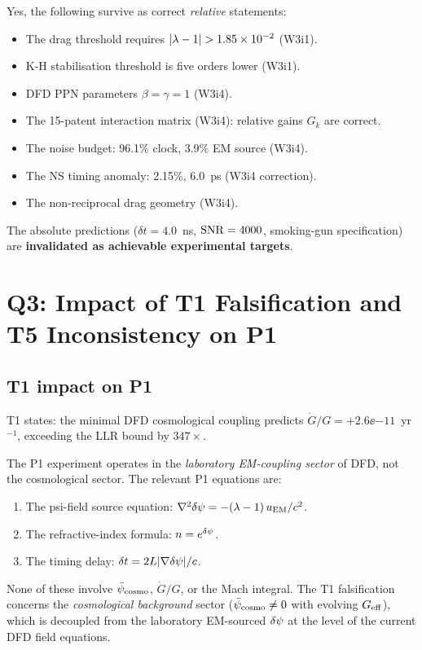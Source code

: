 Yes, the following survive as correct \emph{relative} statements:
\begin{itemize}[nosep]
\item The drag threshold requires $|\lambda - 1| > 1.85\times 10^{-2}$ (W3i1).
\item K-H stabilisation threshold is five orders lower (W3i1).
\item DFD PPN parameters $\beta = \gamma = 1$ (W3i4).
\item The 15-patent interaction matrix (W3i4): relative gains $G_k$ are
  correct.
\item The noise budget: 96.1\% clock, 3.9\% EM source (W3i4).
\item The NS timing anomaly: 2.15\%, 6.0~ps (W3i4 correction).
\item The non-reciprocal drag geometry (W3i4).
\end{itemize}

The absolute predictions ($\delta t = 4.0$~ns, $\mathrm{SNR} = 4000$, smoking-gun
specification) are \textbf{invalidated as achievable experimental targets}.

\section{Q3: Impact of T1 Falsification and T5 Inconsistency on P1}
\label{sec:T1_T5_impact}

\subsection{T1 impact on P1}
\label{ssec:T1_impact}

T1 states: the minimal DFD cosmological coupling predicts
$\dot{G}/G = +2.6\ee{-11}$~yr$^{-1}$, exceeding the LLR bound by
$347\times$.

\begin{finding}
\label{find:T1_P1}
The P1 experiment operates in the \emph{laboratory EM-coupling sector}
of DFD, not the cosmological sector. The relevant P1 equations are:
\begin{enumerate}[nosep]
\item The psi-field source equation: $\nabla^2\delta\psi = -(\lambda-1)\,u_{\rm EM}/c^2$.
\item The refractive-index formula: $n = e^{\delta\psi}$.
\item The timing delay: $\delta t = 2L|\nabla\delta\psi|/c$.
\end{enumerate}

None of these involve $\bar{\psi}_{\rm cosmo}$, $\dot{G}/G$, or the Mach integral.
The T1 falsification concerns the \emph{cosmological background} sector
($\bar{\psi}_{\rm cosmo} \ne 0$ with evolving $G_{\rm eff}$), which is decoupled from
the laboratory EM-sourced $\delta\psi$ at the level of the current DFD
field equations.
\end{finding}


